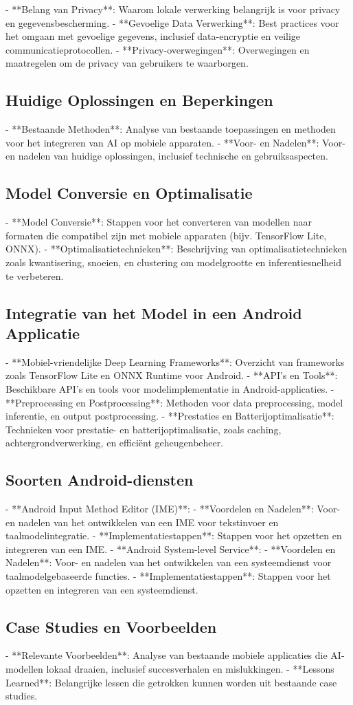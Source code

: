 - **Belang van Privacy**: Waarom lokale verwerking belangrijk is voor privacy en gegevensbescherming.
- **Gevoelige Data Verwerking**: Best practices voor het omgaan met gevoelige gegevens, inclusief data-encryptie en veilige communicatieprotocollen.
- **Privacy-overwegingen**: Overwegingen en maatregelen om de privacy van gebruikers te waarborgen.

\subsection{Huidige Oplossingen en Beperkingen}

- **Bestaande Methoden**: Analyse van bestaande toepassingen en methoden voor het integreren van AI op mobiele apparaten.
- **Voor- en Nadelen**: Voor- en nadelen van huidige oplossingen, inclusief technische en gebruiksaspecten.

\subsection{Model Conversie en Optimalisatie}

- **Model Conversie**: Stappen voor het converteren van modellen naar formaten die compatibel zijn met mobiele apparaten (bijv. TensorFlow Lite, ONNX).
- **Optimalisatietechnieken**: Beschrijving van optimalisatietechnieken zoals kwantisering, snoeien, en clustering om modelgrootte en inferentiesnelheid te verbeteren.

\subsection{Integratie van het Model in een Android Applicatie}

- **Mobiel-vriendelijke Deep Learning Frameworks**: Overzicht van frameworks zoals TensorFlow Lite en ONNX Runtime voor Android.
- **API's en Tools**: Beschikbare API's en tools voor modelimplementatie in Android-applicaties.
- **Preprocessing en Postprocessing**: Methoden voor data preprocessing, model inferentie, en output postprocessing.
- **Prestaties en Batterijoptimalisatie**: Technieken voor prestatie- en batterijoptimalisatie, zoals caching, achtergrondverwerking, en efficiënt geheugenbeheer.

\subsection{Soorten Android-diensten}

- **Android Input Method Editor (IME)**:
- **Voordelen en Nadelen**: Voor- en nadelen van het ontwikkelen van een IME voor tekstinvoer en taalmodelintegratie.
- **Implementatiestappen**: Stappen voor het opzetten en integreren van een IME.
- **Android System-level Service**:
- **Voordelen en Nadelen**: Voor- en nadelen van het ontwikkelen van een systeemdienst voor taalmodelgebaseerde functies.
- **Implementatiestappen**: Stappen voor het opzetten en integreren van een systeemdienst.

\subsection{Case Studies en Voorbeelden}

- **Relevante Voorbeelden**: Analyse van bestaande mobiele applicaties die AI-modellen lokaal draaien, inclusief succesverhalen en mislukkingen.
- **Lessons Learned**: Belangrijke lessen die getrokken kunnen worden uit bestaande case studies.
